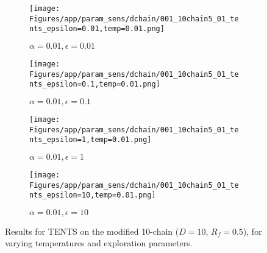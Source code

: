 \documentclass{article}
\theoremstyle{plain}
\begin{document}
\begin{appendices}
\begin{figure}
                \begin{subfigure}[b]{0.24\textwidth}
                    \centering
                    \texttt{[image: Figures/app/param\_sens/dchain/001\_10chain5\_01\_tents\_epsilon=0.01,temp=0.01.png]}
                    \caption*{$\alpha=0.01,\epsilon=0.01$}
                \end{subfigure}
                \begin{subfigure}[b]{0.24\textwidth}
                    \centering
                    \texttt{[image: Figures/app/param\_sens/dchain/001\_10chain5\_01\_tents\_epsilon=0.1,temp=0.01.png]}
                    \caption*{$\alpha=0.01,\epsilon=0.1$}
                \end{subfigure}
                \begin{subfigure}[b]{0.24\textwidth}
                    \centering
                    \texttt{[image: Figures/app/param\_sens/dchain/001\_10chain5\_01\_tents\_epsilon=1,temp=0.01.png]}
                    \caption*{$\alpha=0.01,\epsilon=1$}
                \end{subfigure}
                \begin{subfigure}[b]{0.24\textwidth}
                    \centering
                    \texttt{[image: Figures/app/param\_sens/dchain/001\_10chain5\_01\_tents\_epsilon=10,temp=0.01.png]}
                    \caption*{$\alpha=0.01,\epsilon=10$}
                \end{subfigure}
                
                \caption{Results for TENTS on the modified 10-chain ($D=10$, $R_f=0.5$), for varying temperatures and exploration parameters.}
                \label{fig:tents_10chain_half_hps}
            \end{figure}


            \begin{figure}
                \centering
                

\end{figure}
\end{appendices}
\end{document}
